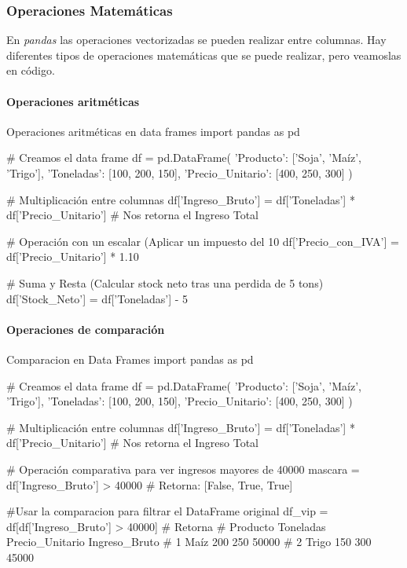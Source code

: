 \subsubsection{Operaciones Matemáticas}

En \textit{pandas} las operaciones vectorizadas se pueden realizar entre columnas. Hay diferentes tipos de operaciones matemáticas que se puede realizar, pero veamoslas en código.

\paragraph{Operaciones aritméticas}
\begin{pycode}{Operaciones aritméticas en data frames}
import pandas as pd

# Creamos el data frame
df = pd.DataFrame({
'Producto': ['Soja', 'Maíz', 'Trigo'],
'Toneladas': [100, 200, 150],
'Precio_Unitario': [400, 250, 300]
})

# Multiplicación entre columnas
df['Ingreso_Bruto'] = df['Toneladas'] * df['Precio_Unitario'] # Nos retorna el Ingreso Total

# Operación con un escalar (Aplicar un impuesto del 10%
df['Precio_con_IVA'] = df['Precio_Unitario'] * 1.10

# Suma y Resta (Calcular stock neto tras una perdida de 5 tons)
df['Stock_Neto'] = df['Toneladas'] - 5
\end{pycode}

\paragraph{Operaciones de comparación}
\begin{pycode}{Comparacion en Data Frames}
import pandas as pd

# Creamos el data frame
df = pd.DataFrame({
'Producto': ['Soja', 'Maíz', 'Trigo'],
'Toneladas': [100, 200, 150],
'Precio_Unitario': [400, 250, 300]
})

# Multiplicación entre columnas
df['Ingreso_Bruto'] = df['Toneladas'] * df['Precio_Unitario'] # Nos retorna el Ingreso Total

# Operación comparativa para ver ingresos mayores de 40000
mascara = df['Ingreso_Bruto'] > 40000 # Retorna: [False, True, True]

#Usar la comparacion para filtrar el DataFrame original
df_vip = df[df['Ingreso_Bruto'] > 40000] # Retorna
#   Producto  Toneladas  Precio_Unitario  Ingreso_Bruto
# 1     Maíz        200              250          50000
# 2    Trigo        150              300          45000
\end{pycode}


